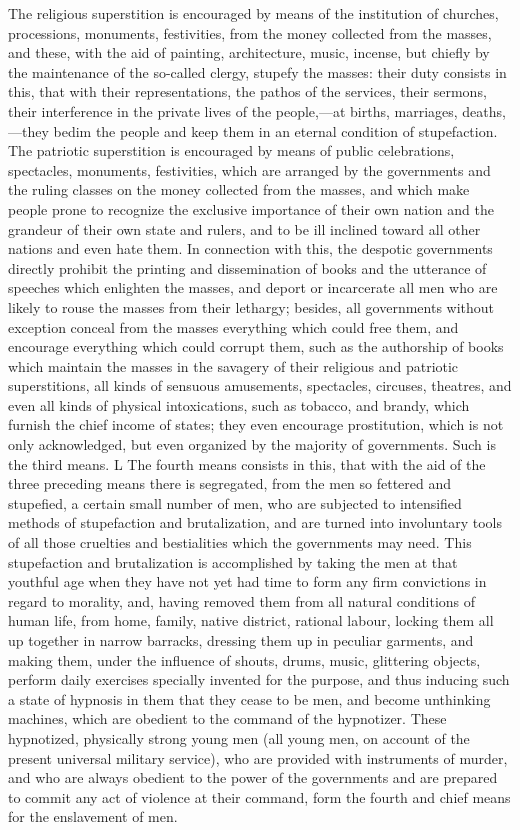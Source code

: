 \documentclass{book}
\begin{document}
The religious superstition is encouraged by means of the institution of churches, processions, monuments, festivities, from the money collected from the masses, and these, with the aid of painting, architecture, music, incense, but chiefly by the maintenance of the so-called clergy, stupefy the masses: their duty consists in this, that with their representations, the pathos of the services, their sermons, their interference in the private lives of the people,—at births, marriages, deaths,—they bedim the people and keep them in an eternal condition of stupefaction. The patriotic superstition is encouraged by means of public celebrations, spectacles, monuments, festivities, which are arranged by the governments and the ruling classes on the money collected from the masses, and which make people prone to recognize the exclusive importance of their own nation and the grandeur of their own state and rulers, and to be ill inclined toward all other nations and even hate them. In connection with this, the despotic governments directly prohibit the printing and dissemination of books and the utterance of speeches which enlighten the masses, and deport or incarcerate all men who are likely to rouse the masses from their lethargy; besides, all governments without exception conceal from the masses everything which could free them, and encourage everything which could corrupt them, such as the authorship of books which maintain the masses in the savagery of their religious and patriotic superstitions, all kinds of sensuous amusements, spectacles, circuses, theatres, and even all kinds of physical intoxications, such as tobacco, and brandy, which furnish the chief income of states; they even encourage prostitution, which is not only acknowledged, but even organized by the majority of governments. Such is the third means. L The fourth means consists in this, that with the aid of the three preceding means there is segregated, from the men so fettered and stupefied, a certain small number of men, who are subjected to intensified methods of stupefaction and brutalization, and are turned into involuntary tools of all those cruelties and bestialities which the governments may need. This stupefaction and brutalization is accomplished by taking the men at that youthful age when they have not yet had time to form any firm convictions in regard to morality, and, having removed them from all natural conditions of human life, from home, family, native district, rational labour, locking them all up together in narrow barracks, dressing them up in peculiar garments, and making them, under the influence of shouts, drums, music, glittering objects, perform daily exercises specially invented for the purpose, and thus inducing such a state of hypnosis in them that they cease to be men, and become unthinking machines, which are obedient to the command of the hypnotizer. These hypnotized, physically strong young men (all young men, on account of the present universal military service), who are provided with instruments of murder, and who are always obedient to the power of the governments and are prepared to commit any act of violence at their command, form the fourth and chief means for the enslavement of men.
\end{document}
